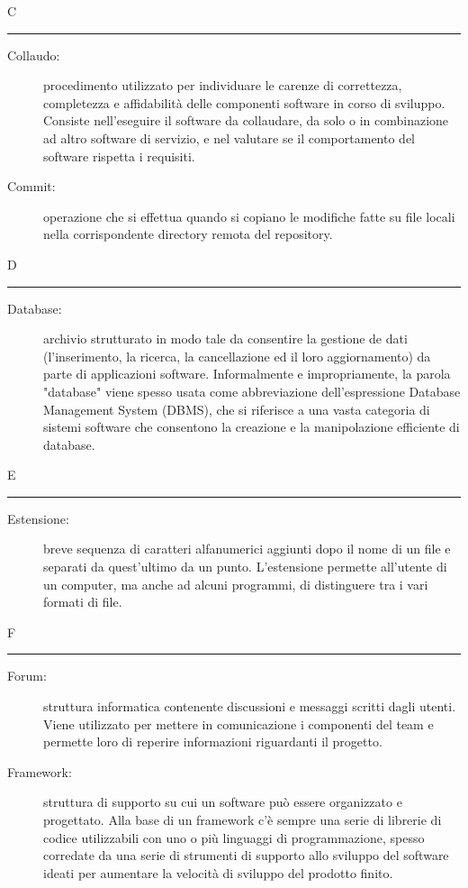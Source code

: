 \documentclass[11pt,a4paper]{article}
\begin{document}
\bigskip
\Huge C \bigskip
\hrule
\smallskip
\normalsize
\begin{description}
	\item[Collaudo:] procedimento utilizzato per individuare le carenze di correttezza, completezza e affidabilità delle componenti software in corso di sviluppo. Consiste nell'eseguire il software da collaudare, da solo o in combinazione ad altro software di servizio, e nel valutare se il comportamento del software rispetta i requisiti.
	\item[Commit:] operazione che si effettua quando si copiano le modifiche fatte su file locali nella corrispondente directory remota del repository.
\end{description}
\bigskip
\Huge D \bigskip
\hrule
\smallskip
\normalsize
\begin{description}
	\item[Database:] archivio strutturato in modo tale da consentire la gestione de dati (l'inserimento, la ricerca, la cancellazione ed il loro aggiornamento) da parte di applicazioni software. Informalmente e impropriamente, la parola "database" viene spesso usata come abbreviazione dell'espressione Database Management System (DBMS), che si riferisce a una vasta categoria di sistemi software che consentono la creazione e la manipolazione efficiente di database.
\end{description}
\bigskip
\Huge E \bigskip
\hrule
\smallskip
\normalsize
\begin{description}
	\item[Estensione:] breve sequenza di caratteri alfanumerici aggiunti dopo il nome di un file e separati da quest'ultimo da un punto. L'estensione permette all'utente di un computer, ma anche ad alcuni programmi, di distinguere tra i vari formati di file.
\end{description}
\bigskip
\Huge F \bigskip
\hrule
\smallskip
\normalsize
\begin{description}
	\item[Forum:] struttura informatica contenente discussioni e messaggi scritti dagli utenti. Viene utilizzato per mettere in comunicazione i componenti del team e permette loro di reperire informazioni riguardanti il progetto.
	\item[Framework:] struttura di supporto su cui un software può essere organizzato e progettato. Alla base di un framework c'è sempre una serie di librerie di codice utilizzabili con uno o più linguaggi di programmazione, spesso corredate da una serie di strumenti di supporto allo sviluppo del software ideati per aumentare la velocità di sviluppo del prodotto finito.
\end{description}
\end{document}
